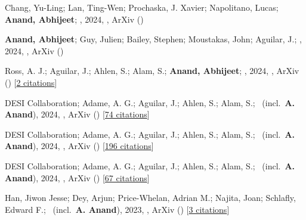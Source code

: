 \item[{\color{numcolor}\scriptsize7}] Chang, Yu-Ling; Lan, Ting-Wen; Prochaska, J. Xavier; Napolitano, Lucas; \textbf{Anand, Abhijeet}; \etal, 2024, , ArXiv ()

\item[{\color{numcolor}\scriptsize6}] \textbf{Anand, Abhijeet}; Guy, Julien; Bailey, Stephen; Moustakas, John; Aguilar, J.; \etal, 2024, , ArXiv ()

\item[{\color{numcolor}\scriptsize5}] Ross, A. J.; Aguilar, J.; Ahlen, S.; Alam, S.; \textbf{Anand, Abhijeet}; \etal, 2024, , ArXiv () [\href{https://ui.adsabs.harvard.edu/abs/2024arXiv240516593R}{2 citations}]

\item[{\color{numcolor}\scriptsize4}] DESI Collaboration; Adame, A. G.; Aguilar, J.; Ahlen, S.; Alam, S.; \etal\ (incl.\ \textbf{A. Anand}), 2024, , ArXiv () [\href{https://ui.adsabs.harvard.edu/abs/2024arXiv240403000D}{74 citations}]

\item[{\color{numcolor}\scriptsize3}] DESI Collaboration; Adame, A. G.; Aguilar, J.; Ahlen, S.; Alam, S.; \etal\ (incl.\ \textbf{A. Anand}), 2024, , ArXiv () [\href{https://ui.adsabs.harvard.edu/abs/2024arXiv240403002D}{196 citations}]

\item[{\color{numcolor}\scriptsize2}] DESI Collaboration; Adame, A. G.; Aguilar, J.; Ahlen, S.; Alam, S.; \etal\ (incl.\ \textbf{A. Anand}), 2024, , ArXiv () [\href{https://ui.adsabs.harvard.edu/abs/2024arXiv240403001D}{67 citations}]

\item[{\color{numcolor}\scriptsize1}] Han, Jiwon Jesse; Dey, Arjun; Price-Whelan, Adrian M.; Najita, Joan; Schlafly, Edward F.; \etal\ (incl.\ \textbf{A. Anand}), 2023, , ArXiv () [\href{https://ui.adsabs.harvard.edu/abs/2023arXiv230611784H}{3 citations}]